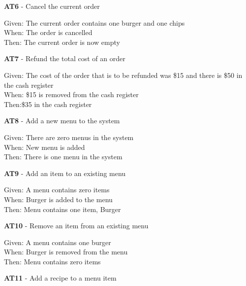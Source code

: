 \linebreak
\textbf{AT6} - Cancel the current order\\
\begin{small}
Given: The current order contains one burger and one chips\\
When: The order is cancelled\\
Then: The current order is now empty\\
\end{small}
\linebreak
\textbf{AT7} - Refund the total cost of an order\\
\begin{small}
Given: The cost of the order that is to be refunded was \$15 and there is \$50 in the cash register\\
When: \$15 is removed from the cash register\\
Then:\$35 in the cash register\\
\end{small}
\linebreak
\textbf{AT8} - Add a new menu to the system\\
\begin{small}
Given: There are zero menus in the system\\
When: New menu is added\\
Then: There is one menu in the system\\
\end{small}
\linebreak
\textbf{AT9} - Add an item to an existing menu\\
\begin{small}
Given: A menu contains zero items\\
When: Burger is added to the menu\\
Then: Menu contains one item, Burger\\
\end{small}
\linebreak
\textbf{AT10} - Remove an item from an existing menu\\
\begin{small}
Given: A menu contains one burger\\
When: Burger is removed from the menu\\
Then: Menu contains zero items\\
\end{small}
\linebreak
\textbf{AT11} - Add a recipe to a menu item\\

